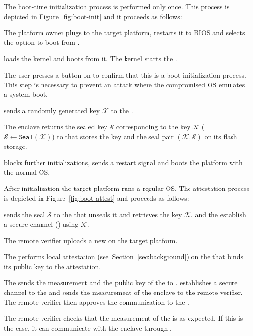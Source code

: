  The boot-time initialization process is performed only once.
This process is depicted in Figure~\ref{fig:boot-init} and it proceeds as follows:



\begin{mylist}
  \item[\one] The platform owner plugs \device to the target platform, restarts it to BIOS and selects the option to boot from \device.
  \item[\two] \device loads the \name kernel and boots from it. The \name kernel starts the \nameclave.
  \item[\three] The user presses a button on \device to confirm that this is a boot-initialization process. This step is necessary to prevent an attack where the compromised OS emulates a system boot.
  \item[\four] \device sends a randomly generated key $\mathcal{K}$ to the \nameclave.
  \item[\five] The enclave returns the sealed key $\mathcal{S}$ corresponding to the key $\mathcal{K}$ ($\mathcal{S}\leftarrow\texttt{Seal}(\mathcal{K})$) to \device that stores the key and the seal pair $(\mathcal{K}, \mathcal{S})$ on its flash storage.
  \item[\six] \device blocks further initializations, sends a restart signal and boots the platform with the normal OS.
\end{mylist}

\parasaver
{} After initialization the target platform runs a regular OS. The attestation process is depicted in Figure~\ref{fig:boot-attest} and proceeds as follows:

\begin{mylist}


  \item[\one] \device sends the seal $\mathcal{S}$ to the \nameclave that unseals it and retrieves the key $\mathcal{K}$. \device and the \nameclave establish a secure channel (\tls) using $\mathcal{K}$.

  \item[\two] The remote verifier uploads a new \app on the target platform.

  \item[\three] The \nameclave performs local attestation (see~Section~\ref{sec:background}) on the \app that binds its public key to the attestation. %

  \item[\four] The \nameclave sends the measurement and the public key of the \app to \device. \device establishes a secure channel to the \app and sends the measurement of the enclave to the remote verifier. The remote verifier then approves the communication to the \app.

  \item[\five] The remote verifier checks that the measurement of the \app is as expected. If this is the case, it can communicate with the enclave through \device.


\end{mylist}


